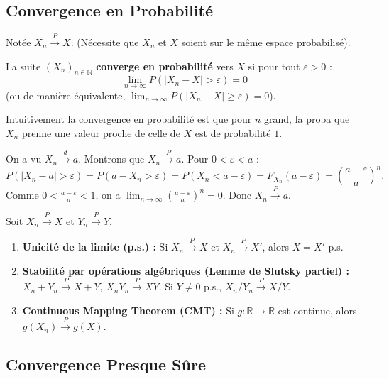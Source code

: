 \subsection{Convergence en Probabilité}

Notée $X_n \xrightarrow{P} X$. (Nécessite que $X_n$ et $X$ soient sur le même espace probabilisé).

\begin{definition}
La suite $(X_n)_{n \in \mathbb{N}}$ \textbf{converge en probabilité} vers $X$ si pour tout $\varepsilon > 0$ :
$$\lim_{n \to \infty} P(|X_n - X| > \varepsilon) = 0$$
(ou de manière équivalente, $\lim_{n \to \infty} P(|X_n - X| \ge \varepsilon) = 0$).
\end{definition}
Intuitivement la convergence en probabilité  est que pour $n$ grand, la proba que $X_n$ prenne une valeur proche de celle de $X$ est de probabilité $1$.

\begin{exemple}[{Suite de $X_n = \max(U_i)$ avec $U_i \sim \mathcal{U}([0,a])$}]

On a vu $X_n \xrightarrow{d} a$. Montrons que $X_n \xrightarrow{P} a$. Pour $0 < \varepsilon < a$ :
\[
P(|X_n - a| > \varepsilon) = P(a - X_n > \varepsilon) = P(X_n < a - \varepsilon)
= F_{X_n}(a - \varepsilon) = \left(\frac{a-\varepsilon}{a}\right)^n .
\]
Comme $0 < \frac{a-\varepsilon}{a} < 1$, on a $\lim_{n \to \infty} \left(\frac{a-\varepsilon}{a}\right)^n = 0$. Donc $X_n \xrightarrow{P} a$.
\end{exemple}

\begin{proposition}
Soit $X_n \xrightarrow{P} X$ et $Y_n \xrightarrow{P} Y$.
\begin{enumerate}
    \item \textbf{Unicité de la limite (p.s.) :} Si $X_n \xrightarrow{P} X$ et $X_n \xrightarrow{P} X'$, alors $X = X'$ p.s.
    \item \textbf{Stabilité par opérations algébriques (Lemme de Slutsky partiel) :} $X_n + Y_n \xrightarrow{P} X + Y$, $X_n Y_n \xrightarrow{P} XY$. Si $Y \neq 0$ p.s., $X_n / Y_n \xrightarrow{P} X/Y$.
    \item \textbf{Continuous Mapping Theorem (CMT) :} Si $g : \mathbb{R} \to \mathbb{R}$ est continue, alors $g(X_n) \xrightarrow{P} g(X)$.
\end{enumerate}
\end{proposition}

\subsection{Convergence Presque Sûre}

